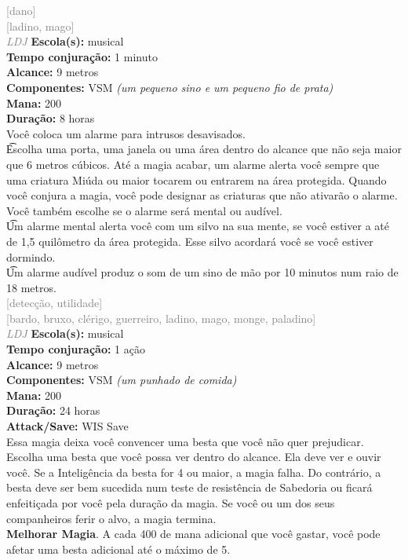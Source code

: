 \documentclass{RPG_Adventure}[2021/10/20]
\begin{document}
{\scriptsize \textcolor{gray}{[dano]\\}}
{\scriptsize \textcolor{gray}{[ladino, mago]\\}}
{\tiny \textcolor{gray}{\textit{LDJ}}}
{\small \t \textbf{Escola(s):} musical\\\t \textbf{Tempo conjuração:} 1 minuto\\\t \textbf{Alcance:} 9 metros\\\t \textbf{Componentes:} VSM \textit{(um pequeno sino e um pequeno fio de prata)}\\\t \textbf{Mana:} 200\\\t \textbf{Duração:} 8 horas\\}
{\normalsize Você coloca um alarme para intrusos desavisados.\\\t Escolha uma porta, uma janela ou uma área dentro do alcance que não seja maior que 6 metros cúbicos. Até a magia acabar, um alarme alerta você sempre que uma criatura Miúda ou maior tocarem ou entrarem na área protegida. Quando você conjura a magia, você pode designar as criaturas que não ativarão o alarme. Você também escolhe se o alarme será mental ou audível.\\\t Um alarme mental alerta você com um silvo na sua mente, se você estiver a até de 1,5 quilômetro da área protegida. Esse silvo acordará você se você estiver dormindo.\\\t Um alarme audível produz o som de um sino de mão por 10 minutos num raio de 18 metros. \\}
{\scriptsize \textcolor{gray}{[detecção, utilidade]\\}}
{\scriptsize \textcolor{gray}{[bardo, bruxo, clérigo, guerreiro, ladino, mago, monge, paladino]\\}}
{\tiny \textcolor{gray}{\textit{LDJ}}}
{\small \t \textbf{Escola(s):} musical\\\t \textbf{Tempo conjuração:} 1 ação\\\t \textbf{Alcance:} 9 metros\\\t \textbf{Componentes:} VSM \textit{(um punhado de comida)}\\\t \textbf{Mana:} 200\\\t \textbf{Duração:} 24 horas\\\t \textbf{Attack/Save:} WIS Save\\}
{\normalsize Essa magia deixa você convencer uma besta que você não quer prejudicar. Escolha uma besta que você possa ver dentro do alcance. Ela deve ver e ouvir você. Se a Inteligência da besta for 4 ou maior, a magia falha. Do contrário, a besta deve ser bem sucedida num teste de resistência de Sabedoria ou ficará enfeitiçada por você pela duração da magia. Se você ou um dos seus companheiros ferir o alvo, a magia termina.\\\t \textbf{Melhorar Magia}. A cada 400 de mana adicional que você gastar, você pode afetar uma besta adicional até o máximo de 5.\\}
\end{document}
